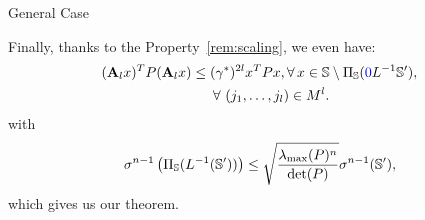 \begin{subsection}{General Case}
\begin{pf}
Finally, thanks to the  Property~\ref{rem:scaling}, we even have:
\begin{equation}\label{eqn:P1}
\begin{aligned}
& (\mathbf{A}_l x)^T P (\mathbf{A}_l x) \leq (\gamma^*)^{2l} x^T P x,  \forall\, x \in \sphere \setminus \proj_\sphere(\ayca{L^{-1}}\sphere'), \\
& \qquad \qquad \qquad \qquad \forall\ (j_1,\dots,j_l) \in M^l.
\end{aligned}
\end{equation}
with $$\sigma^{n-1} \left(  \Pi_{\mathbb{S}}(L^{-1}(\mathbb{S}')) \right) \leq \sqrt{\frac{\lambda_{\max}(P)^n}{\det(P)}}\sigma^{n-1}(\mathbb{S}'), $$ which gives us our theorem.


\end{pf}

\end{subsection}